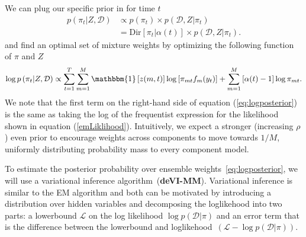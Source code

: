 \documentclass[sagev,times,Review,10pt]{sagej}
\def\l{\left}
\def\r{\right}
\newcommand{\f}{\frac}
\begin{document}
We can plug our specific prior in for time $t$
\begin{equation}
  \begin{aligned}
    p(\pi_{t} | Z, \mathcal{D}) &\propto p\l(\pi_{t}\r) \times p\l(\mathcal{D},Z | \pi_{t}\r)\\
    &= \text{Dir}\l[\pi_{t} | \alpha(t)\r] \times p\l(\mathcal{D},Z | \pi_{t}\r) \label{bayesModel}.
  \end{aligned}
\end{equation}
and find an optimal set of mixture weights by optimizing the following function of $\pi$ and $Z$
\begin{align}
    \log p\l(\pi_{t}|Z,\mathcal{D}\r) \propto \sum_{t=1}^{T} \sum_{m=1}^{M} \mathbbm{1}\l[z(m,t)\r] \log\l[\pi_{mt}f_{m}(y_{t})\r] + \sum_{m=1}^{M} \l[\alpha(t)-1\r] \log \pi_{mt}. \label{eq:logposterior}
\end{align}
We note that the first term on the right-hand side of equation (\ref{eq:logposterior}) is the same as taking the log of the frequentist expression for the likelihood shown in equation (\ref{emLiklihood}).
Intuitively, we expect a stronger (increasing $\rho$) even prior to encourage weights across components to move towards $1/M$, uniformly distributing probability mass to every component model.

To estimate the posterior probability over ensemble weights~\eqref{eq:logposterior},  we will use a variational inference algorithm~(\textbf{deVI-MM}).
Variational inference is similar to the EM algorithm and both can be motivated by introducing a distribution over hidden variables and decomposing the loglikehood into two parts: a lowerbound $\mathcal{L}$ on the log likelihood $\log p(\mathcal{D}|\pi)$ and an error term that is the difference between the lowerbound and loglikehood~$\l( \mathcal{L} - \log p\l(\mathcal{D}|\pi \r) \r)$.
\end{document}
